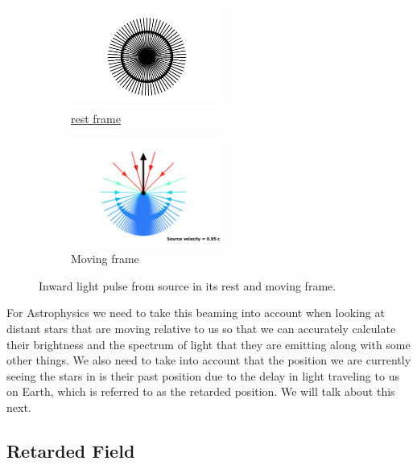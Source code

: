 \begin{figure}[H]
	\begin{subfigure}{.49\textwidth}
		\centering
		\includegraphics[width=5cm]{images/pdf/Rest_velocities_inwards.pdf}
		\caption{\hyperlink{def-proper-frame}{rest frame}}
	\end{subfigure}
	\begin{subfigure}{.49\textwidth}
		\centering
		\includegraphics[width=5cm]{images/pdf/Aberrated_velocities_inwards.pdf}
		\caption{Moving frame}
	\end{subfigure}
	\caption{Inward light pulse from source in its rest and moving frame.}
	\label{fig: Relativistic Beaming Recieved}
\end{figure}

For Astrophysics we need to take this beaming into account when looking at distant stars that are moving relative to us so that we can accurately calculate their brightness and the spectrum of light that they are emitting along with some other things. We also need to take into account that the position we are currently seeing the stars in is their past position due to the delay in light traveling to us on Earth, which is referred to as the retarded position. We will talk about this next.

\subsection{Retarded Field}

